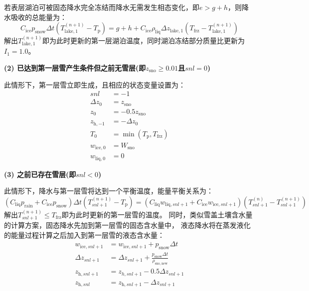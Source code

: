 若表层湖泊可被固态降水完全冻结而降水无需发生相态变化，即$e>g+h$，则降水吸收的总能量为：
\begin{equation}
  C_{\mathrm{ice}} p_{\mathrm {snow}} \Delta t\left(T_{\mathrm{lake, 1}}^{(n+1)}-T_{\mathrm{p}}\right)=g+h+C_{\mathrm{ice}} \rho_{\mathrm{liq}} \Delta z_{\mathrm{lake, 1}}
  \left(T_{\mathrm {frz}}-T_{\mathrm{lake,1}}^{(n+1)}\right)
\end{equation}
解出$T_{\mathrm{lake,1}}^{\left(n+1\right)}$即为此时更新的第一层湖泊温度，同时湖泊冻结部分质量比更新为$I_1=1.0$。


\noindent\textbf {(2) 已达到第一层雪产生条件但之前无雪层(即$z_{\mathrm{sno}}\geqslant 0.01$且$snl=0$)}

此情形下，第一层雪立即生成，且相应的状态变量设置为：
\begin{equation}
  \begin{aligned}
    snl &= -1 \\
    \Delta z_{0} &= z_{\mathrm{sno}} \\
    z_{0} &= -0.5 z_{\mathrm{sno}} \\
    z_{\mathrm{h,-1}} &= -\Delta z_{0} \\
    T_{0} &= \min \left(T_{\mathrm{p}}, T_{\mathrm {frz}}\right) \\
    w_{\mathrm{ice, 0}} &= W_{\mathrm{sno}} \\
    w_{\mathrm{liq, 0}} &= 0
  \end{aligned}
\end{equation}


\noindent\textbf {(3) 之前已存在雪层(即$snl<0$)}

此情形下，降水与第一层雪将达到一个平衡温度，能量平衡关系为：
\begin{equation}
  \left(C_{\mathrm{liq}} p_{\mathrm {rain}}+C_{\mathrm{ice}} p_{\mathrm {snow}}\right) \Delta t\left(T_{snl+1}^{(n+1)}-T_{\mathrm{p}}\right)=
  \left(C_{\mathrm{liq}} w_{\mathrm{liq},snl+1}+C_{\mathrm{ice}} w_{\mathrm{ice},snl+1}\right)\left(T_{snl+1}^{(n)}-T_{snl+1}^{(n+1)}\right)
\end{equation}
解出$T_{snl+1}^{\left(n+1\right)}\leqslant T_{\mathrm {frz}} $即为此时更新的第一层雪的温度。
同时，类似雪盖土壤含水量的计算方案，固态降水先加到第一层雪的固态含水量中，
液态降水将在蒸发液化的能量过程计算之后加入到第一层雪的液态含水量：
\begin{equation}
  \begin{aligned}
    w_{\mathrm{ice},snl+1} &=  w_{\mathrm{ice},snl+1}+p_{\mathrm {snow}} \Delta t \\
    \Delta z_{snl+1} &= \Delta z_{snl+1}+\frac{p_{\mathrm {snow}} \Delta t}{\rho_{\mathrm{sno,new}}} \\
    z_{\mathrm{h},snl+1} &= z_{h,snl+1}-0.5 \Delta z_{snl+1} \\
    z_{\mathrm{h}, snl} &= z_{\mathrm{h},snl+1}-\Delta z_{snl+1}
  \end{aligned}
\end{equation}


